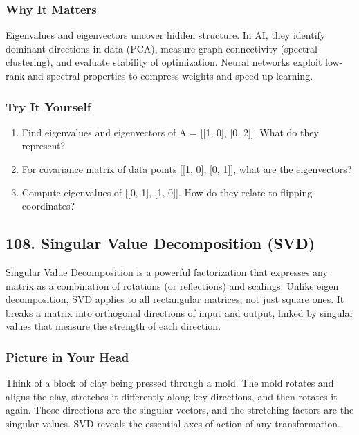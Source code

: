 \documentclass[
  letterpaper,
  DIV=11,
  numbers=noendperiod]{scrreprt}
\providecommand{\tightlist}{%
  \setlength{\itemsep}{0pt}\setlength{\parskip}{0pt}}
\begin{document}
\subsubsection{Why It Matters}\label{why-it-matters-4}

Eigenvalues and eigenvectors uncover hidden structure. In AI, they
identify dominant directions in data (PCA), measure graph connectivity
(spectral clustering), and evaluate stability of optimization. Neural
networks exploit low-rank and spectral properties to compress weights
and speed up learning.

\subsubsection{Try It Yourself}\label{try-it-yourself-106}

\begin{enumerate}
\def\labelenumi{\arabic{enumi}.}
\tightlist
\item
  Find eigenvalues and eigenvectors of A = {[}{[}1, 0{]}, {[}0, 2{]}{]}.
  What do they represent?
\item
  For covariance matrix of data points {[}{[}1, 0{]}, {[}0, 1{]}{]},
  what are the eigenvectors?
\item
  Compute eigenvalues of {[}{[}0, 1{]}, {[}1, 0{]}{]}. How do they
  relate to flipping coordinates?
\end{enumerate}

\subsection{108. Singular Value Decomposition
(SVD)}\label{singular-value-decomposition-svd}

Singular Value Decomposition is a powerful factorization that expresses
any matrix as a combination of rotations (or reflections) and scalings.
Unlike eigen decomposition, SVD applies to all rectangular matrices, not
just square ones. It breaks a matrix into orthogonal directions of input
and output, linked by singular values that measure the strength of each
direction.

\subsubsection{Picture in Your Head}\label{picture-in-your-head-107}

Think of a block of clay being pressed through a mold. The mold rotates
and aligns the clay, stretches it differently along key directions, and
then rotates it again. Those directions are the singular vectors, and
the stretching factors are the singular values. SVD reveals the
essential axes of action of any transformation.
\end{document}
